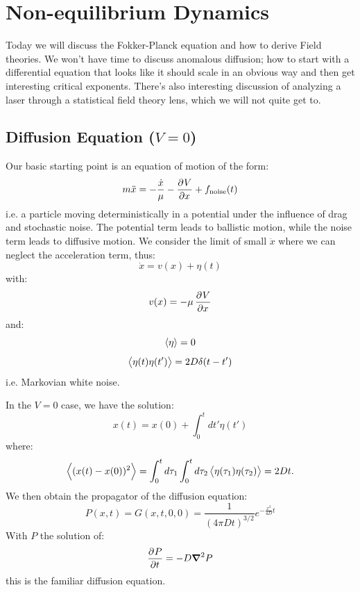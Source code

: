 \section{Non-equilibrium Dynamics}
Today we will discuss the Fokker-Planck equation and how to derive Field theories. We won't have time to discuss anomalous diffusion; how to start with a differential equation that looks like it should scale in an obvious way and then get interesting critical exponents. There's also interesting discussion of analyzing a laser through a statistical field theory lens, which we will not quite get to.

\subsection{Diffusion Equation ($V = 0$)}
Our basic starting point is an equation of motion of the form:
\begin{equation}
    m\ddot{x} = -\frac{\dot{x}}{\mu} - \dpd{V}{x} + f_{\text{noise}}(t)
\end{equation}
i.e. a particle moving deterministically in a potential under the influence of drag and stochastic noise. The potential term leads to ballistic motion, while the noise term leads to diffusive motion. We consider the limit of small $\ddot{x}$ where we can neglect the acceleration term, thus:
\begin{equation}
    \dot{x} = v(x) + \eta(t)
\end{equation}
with:
\begin{equation}
    v(x) = -\mu\dpd{V}{x}
\end{equation}
and:
\begin{equation}
    \left< \eta \right> = 0
\end{equation}
\begin{equation}
    \left< \eta(t)\eta(t') \right> = 2D\delta(t-t')
\end{equation}
i.e. Markovian white noise.

In the $V = 0$ case, we have the solution:
\begin{equation}
    x(t) = x(0) + \int_0^t dt'\eta(t')
\end{equation}
where:
\begin{equation}
    \left< (x(t) - x(0))^2 \right> = \int_0^t d\tau_1 \int_0^t d\tau_2 \left< \eta(\tau_1)\eta(\tau_2) \right> = 2Dt.
\end{equation}
We then obtain the propagator of the diffusion equation:
\begin{equation}
    P(x, t) = G(x, t, 0, 0) = \frac{1}{(4\pi D t)^{3/2}}e^{-\frac{x^2}{4D}t}
\end{equation}
With $P$ the solution of:
\begin{equation}
    \dpd{P}{t} = -D\nabla^2 P
\end{equation}
this is the familiar diffusion equation.

